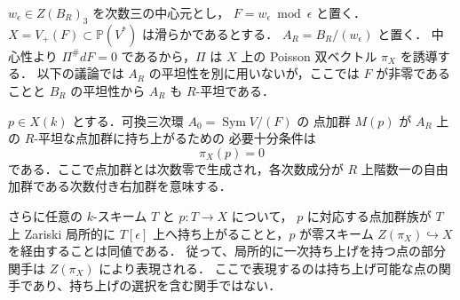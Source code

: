 $w_\epsilon\in Z(B_R)_3$ を次数三の中心元とし，
$F=w_\epsilon\bmod\epsilon$ と置く．
$X=V_+(F)\subset\mathbb P(V^*)$ は滑らかであるとする．
$A_R=B_R/(w_\epsilon)$ と置く．
中心性より $\Pi^\#dF=0$ であるから，$\Pi$ は $X$ 上の
Poisson 双ベクトル $\pi_X$ を誘導する．
以下の議論では $A_R$ の平坦性を別に用いないが，ここでは
$F$ が非零であることと $B_R$ の平坦性から $A_R$ も $R$-平坦である．

\begin{proposition}[点加群の一次持ち上げ]
\label{prop:first-order-point-poisson-zero}
$p\in X(k)$ とする．可換三次環 $A_0=\operatorname{Sym}V/(F)$ の
点加群 $M(p)$ が $A_R$ 上の $R$-平坦な点加群に持ち上がるための
必要十分条件は
\[
 \pi_X(p)=0
\]
である．ここで点加群とは次数零で生成され，各次数成分が
$R$ 上階数一の自由加群である次数付き右加群を意味する．

さらに任意の $k$-スキーム $T$ と $p:T\to X$ について，
$p$ に対応する点加群族が $T$ 上 Zariski 局所的に
$T[\epsilon]$ 上へ持ち上がることと，$p$ が零スキーム
$Z(\pi_X)\hookrightarrow X$ を経由することは同値である．
従って、局所的に一次持ち上げを持つ点の部分関手は $Z(\pi_X)$ により表現される．
ここで表現するのは持ち上げ可能な点の関手であり、持ち上げの選択を含む関手ではない．
\end{proposition}

